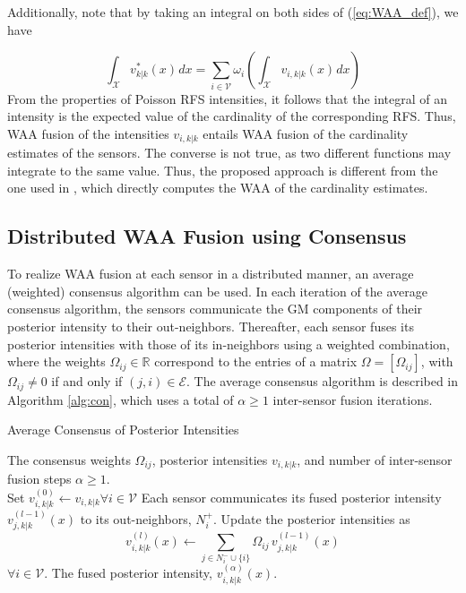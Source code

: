 Additionally, note that by taking an integral on both sides of (\ref{eq:WAA_def}), we have

\begin{equation}
    \int_{\mathcal X} v^{*}_{k|k}(x)\hspace{1pt}dx = \sum_{i \in \mathcal V} \omega_i \left(\int_{\mathcal X} v_{i,k|k}(x)\hspace{1pt}dx\right)
    \label{eq:integral_WAA}
\end{equation}
From the properties of Poisson RFS intensities, it follows that the integral of an intensity is the expected value of the cardinality of the corresponding RFS. Thus, WAA fusion of the intensities $v_{i,k|k}$ entails WAA fusion of the cardinality estimates of the sensors. The converse is not true, as two different functions may integrate to the same value. Thus, the proposed approach is different from the one used in \cite{li2018cardinality}, which directly computes the WAA of the cardinality estimates.

\subsection{Distributed WAA Fusion using Consensus}

To realize WAA fusion at each sensor in a distributed manner, an average (weighted) consensus algorithm can be used. In each iteration of the average consensus algorithm, the sensors communicate the GM components of their posterior intensity to their out-neighbors.
Thereafter, each sensor fuses its posterior intensities with those of its in-neighbors using a weighted combination, where the weights $\Omega_{ij}\in \mathbb R$ correspond to the entries of a matrix $\Omega = [\Omega_{ij}]$, with $\Omega_{ij}\neq 0$ if and only if $(j,i)\in \mathcal E$.
The average consensus algorithm is described in Algorithm \ref{alg:con}, which uses a total of $\alpha \geq 1$ inter-sensor fusion iterations.

\begin{algorithm}
\caption{Average Consensus of Posterior Intensities}
\begin{algorithmic}[1]
\vspace{2pt}
\REQUIRE The consensus weights $\Omega_{ij}$, posterior intensities $v_{i,k|k}$, and number of inter-sensor fusion steps $\alpha \geq 1$.\\
\vspace{3pt} 
\STATE Set $v_{i,k|k}^{(0)} \leftarrow v_{i,k|k} \forall i\in \mathcal V$
\STATE Each sensor communicates its fused posterior intensity $v^{(l-1)}_{j,k|k}(x)$ to its out-neighbors, $N^+_i$. \vspace{2pt}
\STATE Update the posterior intensities as \begin{equation}
    v^{(l)}_{i,k|k}(x) \leftarrow \sum_{j \in N^{-}_i \cup \lbrace i\rbrace} \Omega_{ij} \hspace{2pt} v^{(l-1)}_{j,k|k}(x)
    \label{eq:average_consensus}
\end{equation}
$\forall i\in\mathcal V$.
\ENDFOR
\RETURN The fused posterior intensity, $v^{(\alpha)}_{i,k|k}(x)$.
\end{algorithmic}
\label{alg:con}
\end{algorithm}

